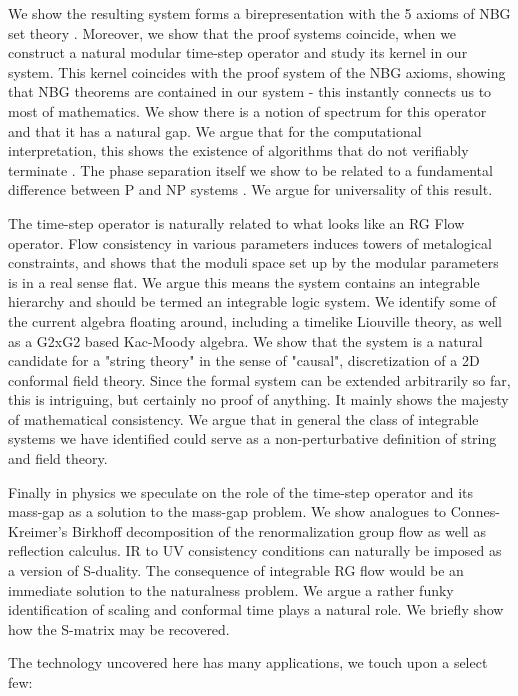 We show the resulting system forms a birepresentation with the 5 axioms of NBG set theory \cite{von_neumann1925}. Moreover, we show that the proof systems coincide, when we construct a natural modular time-step operator and study its kernel in our system. This kernel coincides with the proof system of the NBG axioms, showing that NBG theorems are contained in our system - this instantly connects us to most of mathematics. We show there is a notion of spectrum for this operator and that it has a natural gap. We argue that for the computational interpretation, this shows the existence of algorithms that do not verifiably terminate \cite{turing1936}. The phase separation itself we show to be related to a fundamental difference between P and NP systems \cite{cook1971}. We argue for universality of this result. 

The time-step operator is naturally related to what looks like an RG Flow operator. Flow consistency in various parameters induces towers of metalogical constraints, and shows that the moduli space set up by the modular parameters is in a real sense flat. We argue this means the system contains an integrable hierarchy and should be termed an integrable logic system. We identify some of the current algebra floating around, including a timelike Liouville theory, as well as a G2xG2 based Kac-Moody algebra. We show that the system is a natural candidate for a "string theory" in the sense of "causal", discretization of a 2D conformal field theory. Since the formal system can be extended arbitrarily so far, this is intriguing, but certainly no proof of anything. It mainly shows the majesty of mathematical consistency. We argue that in general the class of integrable systems we have identified could serve as a non-perturbative definition of string and field theory.  

Finally in physics we speculate on the role of the time-step operator and its mass-gap as a solution to the mass-gap problem. We show analogues to Connes-Kreimer's Birkhoff decomposition \cite{connes_kreimer2000} of the renormalization group flow as well as reflection calculus. IR to UV consistency conditions can naturally be imposed as a version of S-duality. The consequence of integrable RG flow would be an immediate solution to the naturalness problem. We argue a rather funky identification of scaling and conformal time plays a natural role. We briefly show how the S-matrix may be recovered. 

The technology uncovered here has many applications, we touch upon a select few:

